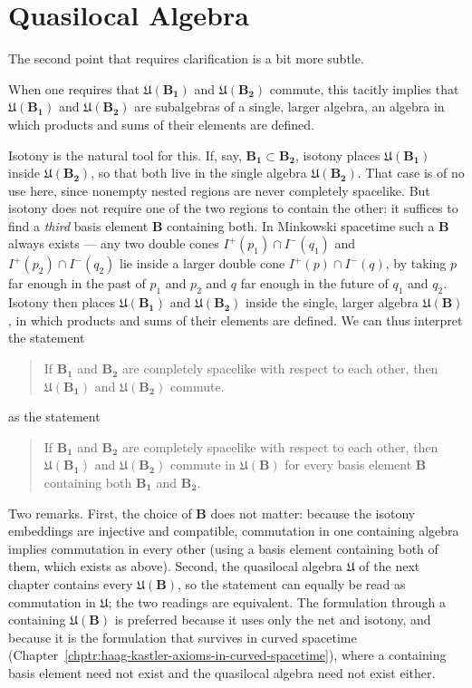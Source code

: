\section{Quasilocal Algebra}\label{sctn:quasilocal-algebra}
The second point that requires clarification is a bit more subtle.

When one requires that $\mathfrak{U}(\mathbf{B_1})$ and $\mathfrak{U}(\mathbf{B_2})$ commute, this tacitly implies that $\mathfrak{U}(\mathbf{B_1})$ and $\mathfrak{U}(\mathbf{B_2})$ are subalgebras of a single, larger algebra, an algebra in which products and sums of their elements are defined.

Isotony is the natural tool for this. If, say, $\mathbf{B_1} \subset \mathbf{B_2}$, isotony
places $\mathfrak{U}(\mathbf{B_1})$ inside $\mathfrak{U}(\mathbf{B_2})$, so that both live in the
single algebra $\mathfrak{U}(\mathbf{B_2})$. That case is of no use here, since nonempty nested regions
are never completely spacelike. But isotony does not require one of the two regions to contain the
other: it suffices to find a \emph{third} basis element $\mathbf{B}$ containing both. In Minkowski
spacetime such a $\mathbf{B}$ always exists --- any two double cones $I^+(p_1) \cap I^-(q_1)$ and
$I^+(p_2) \cap I^-(q_2)$ lie inside a larger double cone $I^+(p) \cap I^-(q)$, by taking $p$
far enough in the past of $p_1$ and $p_2$ and $q$ far enough in the future of $q_1$ and $q_2$.
Isotony then places $\mathfrak{U}(\mathbf{B_1})$ and $\mathfrak{U}(\mathbf{B_2})$ inside the single,
larger algebra $\mathfrak{U}(\mathbf{B})$, in which products and sums of their elements are
defined. We can thus interpret the statement

\begin{quote}
    If $\mathbf{B_1}$ and $\mathbf{B_2}$ are completely spacelike with respect to each other, then $\mathfrak{U}(\mathbf{B_1})$ and $\mathfrak{U}(\mathbf{B_2})$ commute.
\end{quote}

as the statement

\begin{quote}
    If $\mathbf{B_1}$ and $\mathbf{B_2}$ are completely spacelike with respect to each other, then $\mathfrak{U}(\mathbf{B_1})$ and $\mathfrak{U}(\mathbf{B_2})$ commute in $\mathfrak{U}(\mathbf{B})$ for every basis element $\mathbf{B}$ containing both $\mathbf{B_1}$ and $\mathbf{B_2}$.
\end{quote}

Two remarks. First, the choice of $\mathbf{B}$ does not matter: because the isotony embeddings
are injective and compatible, commutation in one containing algebra implies commutation in every
other (using a basis element containing both of them, which exists as above). Second, the quasilocal algebra $\mathfrak{U}$ of the next chapter contains every
$\mathfrak{U}(\mathbf{B})$, so the statement can equally be read as commutation in
$\mathfrak{U}$; the two readings are equivalent. The formulation through a containing
$\mathfrak{U}(\mathbf{B})$ is preferred because it uses only the net and isotony, and because it
is the formulation that survives in curved spacetime (Chapter~\ref{chptr:haag-kastler-axioms-in-curved-spacetime}), where a containing basis element
need not exist and the quasilocal algebra need not exist either.
